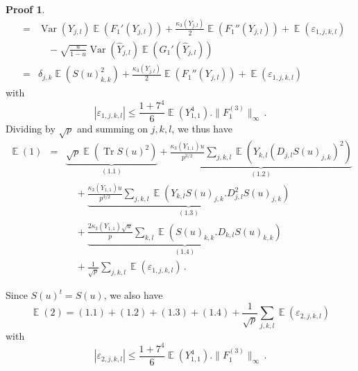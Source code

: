 \documentclass[11pt,a4paper]{article}
\DeclareMathOperator{\E}{\mathbb{E}}
\DeclareMathOperator{\1}{\mathbf{1}}
\DeclareMathOperator{\Var}{\mathrm{Var}}
\DeclareMathOperator{\Tr}{\mathrm{Tr}}
\newcommand{\Yhat}{\widehat{Y}}
\theoremstyle{definition}
\newtheorem*{Proof}{Proof}
\begin{document}
\begin{Proof}
\begin{eqnarray*}
& = & \Var(Y_{j,l}) \E(F_1'(Y_{j,l})) + \frac{\kappa_3(Y_{j,l})}{2} \E(F_1''(Y_{j,l})) + \E(\varepsilon_{1,j,k,l}) \\
& & \quad - \sqrt{\frac{u}{1-u}} \Var(\Yhat_{j,l}) \E(G_1'(\Yhat_{j,l})) \\
& = & \delta_{j,k} \E(S(u)^2_{k,k}) + \frac{\kappa_3(Y_{j,l})}{2} \E(F_1''(Y_{j,l})) + \E(\varepsilon_{1,j,k,l})
\end{eqnarray*}
with
\begin{displaymath}
|\varepsilon_{1,j,k,l}| \le \frac{1+7^4}{6} \E(Y_{1,1}^4) . \|F_1^{(3)}\|_{\infty} \, .
\end{displaymath}
Dividing by $\sqrt{p}$ and summing on $j,k,l$, we thus have
\begin{eqnarray} \label{freeness_general_eq2}
\E(1) & = & \underbrace{  \sqrt{p} \E (\Tr S(u)^2)  }_{(1.1)}  +  \underbrace{  \frac{\kappa_3(Y_{1,1})u}{p^{3/2}} \sum_{j,k,l} \E (Y_{k,l}(D_{j,l}S(u)_{j,k})^2)  }_{(1.2)} \nonumber \\
& & \quad +  \underbrace{  \frac{\kappa_3(Y_{1,1})u}{p^{3/2}} \sum_{j,k,l} \E (Y_{k,l}S(u)_{j,k}.D^2_{j,l}S(u)_{j,k})  }_{(1.3)} \nonumber \\
& & \quad +  \underbrace{  \frac{2\kappa_3(Y_{1,1})\sqrt{u}}{p} \sum_{k,l} \E (S(u)_{k,k}.D_{k,l}S(u)_{k,k})  }_{(1.4)} \nonumber \\
& & \quad +  \frac{1}{\sqrt{p}} \sum_{j,k,l} \E(\varepsilon_{1,j,k,l}) \, .
\end{eqnarray}

Since $S(u)^t = S(u)$, we also have
\begin{equation} \label{freeness_general_eq3}
\E(2) = (1.1) + (1.2) + (1.3) + (1.4) + \frac{1}{\sqrt{p}} \sum_{j,k,l} \E(\varepsilon_{2,j,k,l})
\end{equation}
with
\begin{displaymath}
|\varepsilon_{2,j,k,l}| \le \frac{1+7^4}{6} \E(Y_{1,1}^4) . \|F_1^{(3)}\|_{\infty} \, .
\end{displaymath}


\end{Proof}
\end{document}
